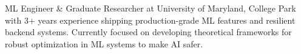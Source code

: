 
\begin{cvparagraph}

ML Engineer \& Graduate Researcher at University of Maryland, College Park with 3+ years experience shipping production-grade ML features and resilient backend systems. Currently focused on developing theoretical frameworks for robust optimization in ML systems to make AI safer.

\end{cvparagraph}
